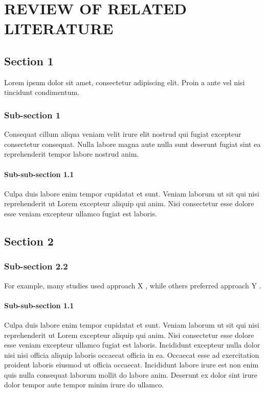 \chapter{REVIEW OF RELATED LITERATURE}

\section{Section 1}

Lorem ipsum dolor sit amet, consectetur adipiscing elit. Proin a ante vel nisi tincidunt condimentum.

\subsection{Sub-section 1}

Consequat cillum aliqua veniam velit irure elit nostrud qui fugiat excepteur consectetur consequat. Nulla labore magna aute nulla sunt deserunt fugiat sint ea reprehenderit tempor labore nostrud anim.

\subsubsection{Sub-sub-section 1.1}

Culpa duis labore enim tempor cupidatat et sunt. Veniam laborum ut sit qui nisi reprehenderit ut Lorem excepteur aliquip qui anim. Nisi consectetur esse dolore esse veniam excepteur ullamco fugiat est laboris.

\section{Section 2}

\subsection{Sub-section 2.2}

For example, many studies used approach X \parencite{placeholderArticle2023}, while others preferred approach Y \parencite{placeholderBook2023}.

\subsubsection{Sub-sub-section 1.1}

Culpa duis labore enim tempor cupidatat et sunt. Veniam laborum ut sit qui nisi reprehenderit ut Lorem excepteur aliquip qui anim. Nisi consectetur esse dolore esse veniam excepteur ullamco fugiat est laboris. Incididunt excepteur nulla dolor nisi nisi officia aliquip laboris occaecat officia in ea. Occaecat esse ad exercitation proident laboris eiusmod ut officia occaecat. Incididunt labore irure est non enim quis nulla consequat laborum mollit do labore anim. Deserunt ex dolor sint irure dolor tempor aute tempor minim irure do ullamco.

